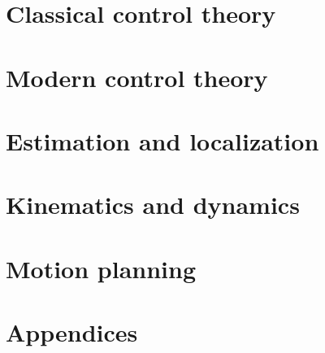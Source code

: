 \documentclass[11pt]{book}
\begin{document}
\frontmatter






\newcommand*{\partpath}{}
\newcommand*{\chapterpath}{}

\mainmatter
\setcounter{chapter}{-1}

\renewcommand*{\partpath}{introduction}


\part{Classical control theory}
\label{part:classical_control_theory}
\renewcommand*{\partpath}{classical-control-theory}




\part{Modern control theory}
\renewcommand*{\partpath}{modern-control-theory}






\part{Estimation and localization}
\renewcommand*{\partpath}{estimation-and-localization}




\part{Kinematics and dynamics}
\label{part:kinematics_and_dynamics}
\renewcommand*{\partpath}{kinematics-and-dynamics}




\part{Motion planning}
\renewcommand*{\partpath}{motion-planning}


\part{Appendices}
\renewcommand{\chaptermark}[1]{\markboth{\sffamily\normalsize\bfseries\appendixname\ \thechapter.\ #1}{}}
\appendix
\renewcommand*{\partpath}{appendices}








\renewcommand{\chaptermark}[1]{\markboth{\sffamily\normalsize\bfseries #1}{}}
\backmatter
{}




\end{document}
